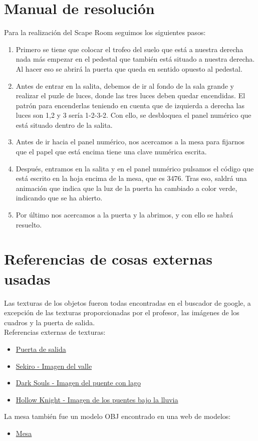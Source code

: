 \section{Manual de resolución}
Para la realización del Scape Room seguimos los siguientes pasos:
\begin{enumerate}
\item Primero se tiene que colocar el trofeo del suelo que está a nuestra derecha nada más empezar en el pedestal que también está situado a nuestra derecha. Al hacer eso se abrirá la puerta que queda en sentido opuesto al pedestal.
\item Antes de entrar en la salita, debemos de ir al fondo de la sala grande y realizar el puzle de luces, donde las tres luces deben quedar encendidas. El patrón para encenderlas teniendo en cuenta que de izquierda a derecha las luces son 1,2 y 3 sería 1-2-3-2. Con ello, se desbloquea el panel numérico que está situado dentro de la salita.
\item Antes de ir hacia el panel numérico, nos acercamos a la mesa para fijarnos que el papel que está encima tiene una clave numérica escrita.
\item Después, entramos en la salita y en el panel numérico pulsamos el código que está escrito en la hoja encima de la mesa, que es 3476. Tras eso, saldrá una animación que indica que la luz de la puerta ha cambiado a color verde, indicando que se ha abierto.
\item Por último nos acercamos a la puerta y la abrimos, y con ello se habrá resuelto.
\end{enumerate}


\section{Referencias de cosas externas usadas}
Las texturas de los objetos fueron todas encontradas en el buscador de google, a excepción de las texturas proporcionadas por el profesor, las imágenes de los cuadros y la puerta de salida.\\

Referencias externas de texturas:
\begin{itemize}
\item \href{https://www.freepik.com/free-photo/dark-wood-background_22681640.htm#page=3&query=door%20texture&position=21&from_view=keyword&track=ais}{Puerta de salida}
\item \href{https://twitter.com/iHF95/status/1648573893421203461?t=UcVHNW73_MvxDO76aAN4kw&s=35}{Sekiro - Imagen del valle}
\item \href{https://twitter.com/VideoArtGame/status/1523029903981035520?t=PVbQMFn-3RuaDs1CJ8d51Q&s=35}{Dark Souls - Imagen del puente con lago}
\item \href{https://twitter.com/Blipbugbug/status/1586608942708555776?t=CJM0u9EX9wyWSQOfAyL-rA&s=35}{Hollow Knight - Imagen de los puentes bajo la lluvia}
\end{itemize} 

La mesa también fue un modelo OBJ encontrado en una web de modelos:

\begin{itemize}
\item \href{https://free3d.com/3d-model/cinema4d-table-66762.html}{Mesa}
\end{itemize}

